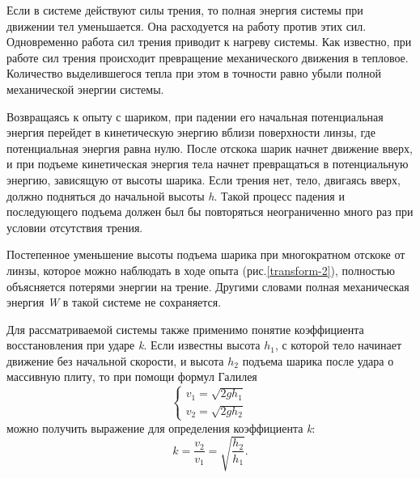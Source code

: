 \documentclass[All.tex]{subfiles}
\begin{document}
Если в системе действуют силы трения, то полная энергия системы при движении тел уменьшается.
Она расходуется на работу против этих сил.
Одновременно работа сил трения приводит к нагреву системы.
Как известно, при работе сил трения происходит превращение механического движения в тепловое.
Количество выделившегося тепла при этом в точности равно убыли полной механической энергии системы. 

Возвращаясь к опыту с шариком, при падении его начальная потенциальная энергия перейдет в кинетическую 
энергию вблизи поверхности линзы, где потенциальная энергия равна нулю.
После отскока шарик начнет движение вверх, и при подъеме кинетическая энергия тела начнет 
превращаться в потенциальную энергию, зависящую от высоты шарика.
Если трения нет, тело, двигаясь вверх, 
должно подняться до начальной высоты \textit{h}.
Такой процесс падения и последующего подъема должен был бы повторяться неограниченно много раз при условии отсутствия трения. 

Постепенное уменьшение высоты подъема шарика при многократном отскоке от линзы, которое можно 
наблюдать в ходе опыта (рис.\ref{transform-2}), полностью объясняется потерями энергии на 
трение.
Другими словами полная механическая энергия \textit{W} в такой системе не сохраняется.

Для рассматриваемой системы также применимо понятие коэффициента восстановления при ударе \textit{k}.
Если известны высота $ h_1 $, с которой тело начинает движение без начальной скорости, и высота $ h_2 $ подъема шарика после удара о массивную плиту, то при помощи формул Галилея
\begin{equation}
\begin{cases}
v_1=\sqrt{2gh_1} \\
v_2=\sqrt{2gh_2}
\end{cases}
\end{equation}
можно получить выражение для определения коэффициента \textit{k}:
\begin{equation}
k=\dfrac{v_2}{v_1}=\sqrt{\dfrac{h_2}{h_1}}.
\end{equation}
\end{document}
